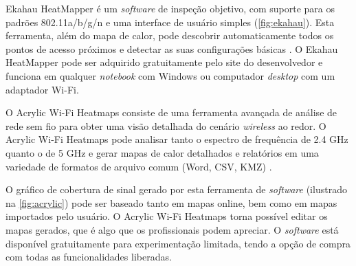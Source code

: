 \label{subsubsubsec:ekahau}

Ekahau HeatMapper é um \textit{software} de inspeção objetivo, com suporte para os padrões 802.11a/b/g/n e uma interface de usuário simples (\autoref{fig:ekahau}). Esta ferramenta, além do mapa de calor, pode descobrir automaticamente todos os pontos de acesso próximos e detectar as suas configurações básicas \cite{Ekahau2019}. O Ekahau HeatMapper pode ser adquirido gratuitamente pelo site do desenvolvedor e funciona em qualquer \textit{notebook} com Windows ou computador \textit{desktop} com um adaptador Wi-Fi.

\begin{figure}[H]
	\centering
\end{figure}

\label{subsubsubsec:acrylic-wifi-heatmaps}

O Acrylic Wi-Fi Heatmaps consiste de uma ferramenta avançada de análise de rede sem fio para obter uma visão detalhada do cenário \textit{wireless} ao redor. O Acrylic Wi-Fi Heatmaps pode analisar tanto o espectro de frequência de 2.4 GHz quanto o de 5 GHz e gerar mapas de calor detalhados e relatórios em uma variedade de formatos de arquivo comum (Word, CSV, KMZ) \cite{Netspot2019}. 

O gráfico de cobertura  de sinal gerado por esta ferramenta de \textit{software} (ilustrado na \autoref{fig:acrylic}) pode ser baseado tanto em mapas online, bem como em mapas importados pelo usuário. O Acrylic Wi-Fi Heatmaps torna possível editar os mapas gerados, que é algo que os profissionais podem apreciar. O \textit{software} está disponível gratuitamente para experimentação limitada, tendo a opção de compra com todas as funcionalidades liberadas.

